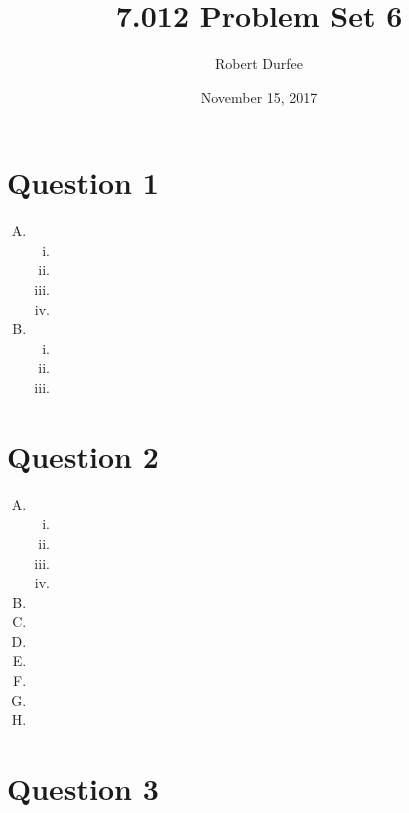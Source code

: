 \documentclass{article}
\title{ 7.012 Problem Set 6 }
\author{ Robert Durfee }
\date{ November 15, 2017 }
\begin{document}
\maketitle

\section*{ Question 1 }

\begin{enumerate}[A.]
    \item 
        \begin{enumerate}[i.]
            \item 
            \item
            \item
            \item
        \end{enumerate}
    \item 
        \begin{enumerate}[i.]
            \item
            \item
            \item
        \end{enumerate}
\end{enumerate}

\section*{Question 2}

\begin{enumerate}[A.]
    \item
        \begin{enumerate}[i.]
            \item
            \item
            \item
            \item
        \end{enumerate}
    \item
    \item
    \item
    \item
    \item
    \item
    \item
\end{enumerate}

\section*{Question 3}
\end{document}
